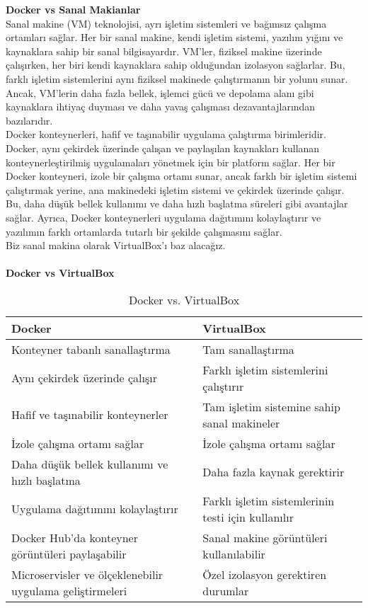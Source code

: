 \textbf{Docker vs Sanal Makianlar} \\
Sanal makine (VM) teknolojisi, ayrı işletim sistemleri ve bağımsız çalışma ortamları sağlar. Her bir sanal makine, kendi işletim sistemi, yazılım yığını ve kaynaklara sahip bir sanal bilgisayardır. VM'ler, fiziksel makine üzerinde çalışırken, her biri kendi kaynaklara sahip olduğundan izolasyon sağlarlar. Bu, farklı işletim sistemlerini aynı fiziksel makinede çalıştırmanın bir yolunu sunar. Ancak, VM'lerin daha fazla bellek, işlemci gücü ve depolama alanı gibi kaynaklara ihtiyaç duyması ve daha yavaş çalışması dezavantajlarından bazılarıdır.\\

Docker konteynerleri, hafif ve taşınabilir uygulama çalıştırma birimleridir. Docker, aynı çekirdek üzerinde çalışan ve paylaşılan kaynakları kullanan konteynerleştirilmiş uygulamaları yönetmek için bir platform sağlar. Her bir Docker konteyneri, izole bir çalışma ortamı sunar, ancak farklı bir işletim sistemi çalıştırmak yerine, ana makinedeki işletim sistemi ve çekirdek üzerinde çalışır. Bu, daha düşük bellek kullanımı ve daha hızlı başlatma süreleri gibi avantajlar sağlar. Ayrıca, Docker konteynerleri uygulama dağıtımını kolaylaştırır ve yazılımın farklı ortamlarda tutarlı bir şekilde çalışmasını sağlar.\\
Biz sanal makina olarak VirtualBox'ı baz alacağız.\\
\\\textbf{Docker vs VirtualBox}
\begin{table}[!h]
    \centering
    \begin{tabular}{|p{}|p{}|}
      \hline
      \textbf{Docker} & \textbf{VirtualBox} \\
      \hline
      Konteyner tabanlı sanallaştırma & Tam sanallaştırma \\
      \hline
      Aynı çekirdek üzerinde çalışır & Farklı işletim sistemlerini çalıştırır \\
      \hline
      Hafif ve taşınabilir konteynerler & Tam işletim sistemine sahip sanal makineler \\
      \hline
      İzole çalışma ortamı sağlar & İzole çalışma ortamı sağlar \\
      \hline
      Daha düşük bellek kullanımı ve hızlı başlatma & Daha fazla kaynak gerektirir \\
      \hline
      Uygulama dağıtımını kolaylaştırır & Farklı işletim sistemlerinin testi için kullanılır \\
      \hline
      Docker Hub'da konteyner görüntüleri paylaşabilir & Sanal makine görüntüleri kullanılabilir \\
      \hline
      Microservisler ve ölçeklenebilir uygulama geliştirmeleri & Özel izolasyon gerektiren durumlar \\
      \hline
    \end{tabular}
    \caption{Docker vs. VirtualBox}
  \end{table}
  
